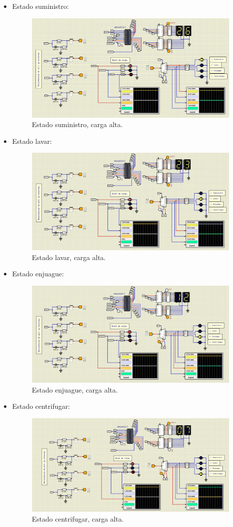 \begin{itemize}
\item Estado suministro:
\begin{figure}[H]
        \centering
        \includegraphics[width=.7\linewidth]{Imagenes/17.png}
        \caption{Estado suministro, carga alta.}
        \label{fig23}
    \end{figure}
\item Estado lavar:
\begin{figure}[H]
        \centering
        \includegraphics[width=.7\linewidth]{Imagenes/18.png}
        \caption{Estado lavar, carga alta.}
        \label{fig24}
    \end{figure}
\item Estado enjuague:
\begin{figure}[H]
        \centering
        \includegraphics[width=.7\linewidth]{Imagenes/19.png}
        \caption{Estado enjuague, carga alta.}
        \label{fig25}
    \end{figure}
\item Estado centrifugar:
\begin{figure}[H]
        \centering
        \includegraphics[width=.7\linewidth]{Imagenes/20.png}
        \caption{Estado centrifugar, carga alta.}
        \label{fig26}
    \end{figure}
\end{itemize}
